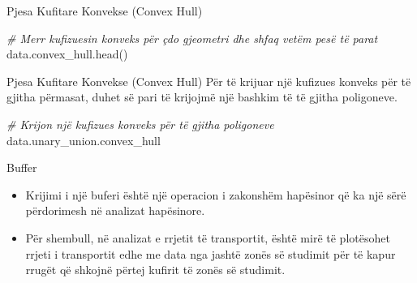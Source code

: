 \documentclass[
  ignorenonframetext,
]{beamer}
\newenvironment{Shaded}{\begin{snugshade}}{\end{snugshade}}
\newcommand{\CommentTok}[1]{\textcolor[rgb]{0.56,0.35,0.01}{\textit{#1}}}
\newcommand{\NormalTok}[1]{#1}
\begin{document}
\begin{frame}[fragile]{Pjesa Kufitare Konvekse (Convex Hull)}
\protect\hypertarget{pjesa-kufitare-konvekse-convex-hull-2}{}

\begin{Shaded}
\begin{Highlighting}[]
\CommentTok{\# Merr kufizuesin konveks për çdo gjeometri dhe shfaq vetëm pesë të parat}
\NormalTok{data.convex\_hull.head()}
\end{Highlighting}
\end{Shaded}
\end{frame}

\begin{frame}[fragile]{Pjesa Kufitare Konvekse (Convex Hull)}
\protect\hypertarget{pjesa-kufitare-konvekse-convex-hull-3}{}
Për të krijuar një kufizues konveks për të gjitha përmasat, duhet së
pari të krijojmë një bashkim të të gjitha poligoneve.


\begin{Shaded}
\begin{Highlighting}[]
\CommentTok{\# Krijon një kufizues konveks për të gjitha poligoneve}
\NormalTok{data.unary\_union.convex\_hull}
\end{Highlighting}
\end{Shaded}
\end{frame}

\begin{frame}{Buffer}
\protect\hypertarget{buffer}{}
\begin{itemize}
\item
  Krijimi i një buferi është një operacion i zakonshëm hapësinor që ka
  një sërë përdorimesh në analizat hapësinore.
\item
  Për shembull, në analizat e rrjetit të transportit, është mirë të
  plotësohet rrjeti i transportit edhe me data nga jashtë zonës së
  studimit për të kapur rrugët që shkojnë përtej kufirit të zonës së
  studimit.
\end{itemize}
\end{frame}
\end{document}
